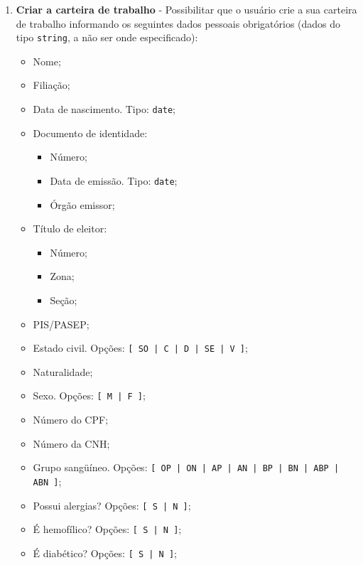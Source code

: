 \documentclass[a4paper,10pt]{article}
\begin{document}
\begin{enumerate}
  \item \textbf{Criar a carteira de trabalho} - Possibilitar que o usuário crie a sua carteira de trabalho informando os seguintes dados pessoais obrigatórios (dados do tipo \texttt{string}, a não ser onde especificado):
    \begin{itemize}
      \item Nome;
      \item Filiação;
      \item Data de nascimento. Tipo: \texttt{date};
      \item Documento de identidade:
      \begin{itemize}
        \item Número;
        \item Data de emissão. Tipo: \texttt{date};
        \item Órgão emissor;
      \end{itemize}
      \item Título de eleitor:
      \begin{itemize}
        \item Número;
        \item Zona;
        \item Seção;
      \end{itemize}
      \item PIS/PASEP;
      \item Estado civil. Opções: \texttt{[ SO | C | D | SE | V ]};
      \item Naturalidade;
      \item Sexo. Opções: \texttt{[ M | F ]};
      \item Número do CPF;
      \item Número da CNH;
      \item Grupo sangüíneo. Opções: \texttt{[ OP | ON | AP | AN | BP | BN | ABP | ABN ]};
      \item Possui alergias? Opções: \texttt{[ S | N ]};
      \item É hemofílico? Opções: \texttt{[ S | N ]};
      \item É diabético? Opções: \texttt{[ S | N ]};

\end{itemize}
\end{enumerate}
\end{document}
